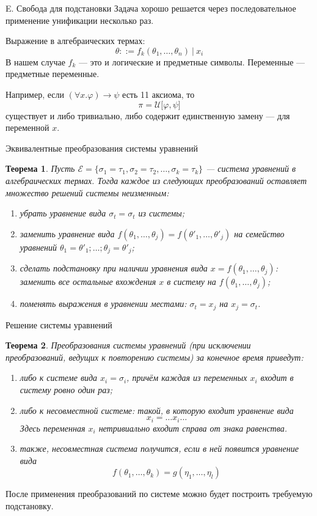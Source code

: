 \documentclass[aspectratio=169]{beamer}
\newtheorem{thm}{Теорема}[section]
\begin{document}
\begin{frame}{E. Свобода для подстановки}
Задача хорошо решается через последовательное применение унификации несколько раз.

Выражение в алгебраических термах: $$\theta ::= f_k(\theta_1,\dots,\theta_n)\ |\ x_i$$
В нашем случае $f_k$ --- это и логические и предметные символы. Переменные --- предметные переменные.

Например, если $(\forall x.\varphi) \rightarrow \psi$ есть 11 аксиома, то
$$\pi = \mathcal{U}\big[\varphi,\psi\big]$$ существует и либо тривиально, либо содержит единственную замену --- для
переменной $x$. 
\end{frame}

\begin{frame}{Эквивалентные преобразования системы уравнений}
\begin{thm}
Пусть $\mathcal{E} = \{ \sigma_1=\tau_1, \sigma_2=\tau_2, \dots, \sigma_k=\tau_k \}$ --- система 
уравнений в алгебраических термах. Тогда каждое из следующих преобразований оставляет множество
решений системы неизменным:
\begin{enumerate}
\item убрать уравнение вида $\sigma_t=\sigma_t$ из системы;
\item заменить уравнение вида $f(\theta_1, \dots, \theta_j) = f(\theta'_1, \dots, \theta'_j)$ на
семейство уравнений $\theta_1=\theta'_1; \dots; \theta_j=\theta'_j$;
\item сделать подстановку при наличии уравнения вида $x = f(\theta_1, \dots, \theta_j)$: заменить
все остальные вхождения $x$ в систему на $f(\theta_1, \dots, \theta_j)$;
\item поменять выражения в уравнении местами: $\sigma_t=x_j$ на $x_j=\sigma_t$.
\end{enumerate}
\end{thm}
\end{frame}

\begin{frame}{Решение системы уравнений}
\begin{thm}
Преобразования системы уравнений (при исключении преобразований, ведущих к повторению системы) 
за конечное время приведут:
\begin{enumerate}
\item либо к системе вида $x_i = \sigma_i$, причём каждая из переменных $x_i$
входит в систему ровно один раз;
\item либо к несовместной системе: такой, в которую входит уравнение вида $$x_i = \dots x_i \dots$$
Здесь переменная $x_i$ нетривиально входит справа от знака равенства.
\item также, несовместная система получится, если в ней появится уравнение вида $$f(\theta_1,\dots,\theta_k) = g(\eta_1,\dots,\eta_l)$$
\end{enumerate}
\end{thm}

После применения преобразований по системе можно будет построить требуемую подстановку.
\end{frame}
\end{document}
